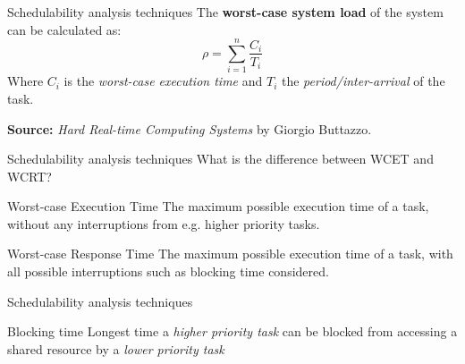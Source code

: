 \begin{frame}{Schedulability analysis techniques}
    The \textbf{worst-case system load} of the system can be calculated as:
    \begin{equation}
        \rho = \sum^{n}_{i=1} \frac{C_i}{T_i}
    \end{equation}
    Where $C_i$ is the \emph{worst-case execution time} and $T_i$ the
    \emph{period/inter-arrival} of the task.
    \vspace{1em}

    \textbf{Source:} \emph{Hard Real-time Computing Systems} by Giorgio Buttazzo.
\end{frame}

\begin{frame}{Schedulability analysis techniques}
    What is the difference between WCET and WCRT?
    \vspace{1em}

    \begin{block}{Worst-case Execution Time}
        The maximum possible execution time of a task, without any
        interruptions from e.g. higher priority tasks.
    \end{block}

    \vspace{1em}

    \begin{block}{Worst-case Response Time}
        The maximum possible execution time of a task, with all
        possible interruptions such as blocking time considered.
    \end{block}
\end{frame}

\begin{frame}{Schedulability analysis techniques}
    \begin{block}{Blocking time}
        Longest time a \emph{higher priority task} can be blocked from accessing a
        shared resource by a \emph{lower priority task}
    \end{block}
\end{frame}




